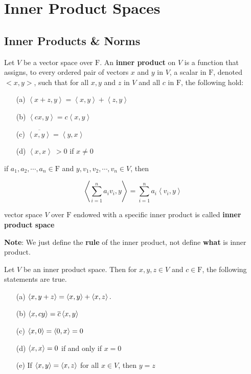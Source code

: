 \section{Inner Product Spaces}

\subsection{Inner Products \& Norms}

\begin{defn}
	Let $V$ be a vector space over $\mathrm F$. An \textbf{inner product} on $V$ is a function that assigns, to every ordered pair of vectors $x$ and $y$ in $V$, a scalar in $\mathrm F$, denoted $<x,y>$, such that for all $x,y$ and $z$ in $V$ and all $c$ in $\mathrm F$, the following hold:
	
	\begin{enumerate}
		\item[(a)] $\left<x+z,y\right> = \left<x,y\right>+\left<z,y\right>$
		\item[(b)] $\left<cx,y\right> = c\left<x,y\right>$
		\item[(c)] $\overline{\left<x,y\right>} = \left<y,x\right>$
		\item[(d)] $\left<x,x\right> ~>0$ if $x \neq 0$
	\end{enumerate}
	
	if $a_1,a_2,\cdots,a_n \in \mathrm F$ and $y,v_1,v_2,\cdots,v_n \in V$, then
	
	$$\left<\sum^n_{i=1}a_iv_i,y\right> = \sum^n_{i=1}a_i\left<v_i,y\right>$$
	
	vector space $V$ over $\mathrm F$ endowed with a specific inner product is called \textbf{inner product space}
\end{defn}

\begin{tcolorbox}
	\textbf{\color{red}Note}: We just define the \textbf{rule} of the inner product, not define \textbf{what} is inner product.
\end{tcolorbox}


\begin{thm*}
	Let $V$ be an inner product space. Then for $x,y,z \in V$ and $c \in \mathrm F$, the following statements are true.
	
	\begin{enumerate}
		\item[(a)] $\left< x,y+z \right> = \left< x,y \right> + \left< x,z \right>.$
		\item[(b)] $\left< x,cy \right> = \overline{c}\left< x,y \right>$
		\item[(c)] $\left< x,0 \right> = \left< 0,x \right> = 0$
		\item[(d)] $\left< x,x \right> = 0$ if and only if $x = 0$
		\item[(e)] If $\left< x,y \right> = \left< x,z \right>$ for all $x \in V$, then $y=z$ 
	\end{enumerate}
\end{thm*}

